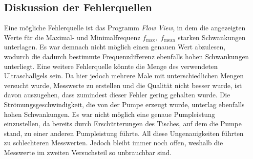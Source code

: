\subsection{Diskussion der Fehlerquellen}
\label{subsec:diskFehler}
Eine mögliche Fehlerquelle ist das Programm \textit{Flow View}, in dem die angezeigten Werte für die Maximal- und Minimalfrequenz $f_{\text{max}},\, \,f_{\text{mean}}$
starken Schwankungen unterlagen. Es war demnach nicht möglich einen genauen Wert abzulesen, wodurch die dadurch bestimmte Frequenzdifferenz ebenfalls
hohen Schwankungen unterliegt.
Eine weitere Fehlerquelle könnte die Menge des verwendeten Ultraschallgels sein. Da hier jedoch mehrere Male mit unterschiedlichen Mengen versucht wurde, Messwerte
zu erstellen und die Qualität nicht besser wurde, ist davon auszugehen, dass zumindest dieser Fehler gering gehalten wurde.
Die Strömungsgeschwindigkeit, die von der Pumpe erzeugt wurde, unterlag ebenfalls hohen Schwankungen. Es war nicht möglich eine genaue Pumpleistung
einzustellen, da bereits durch Erschütterungen des Tisches, auf dem die Pumpe stand, zu einer anderen Pumpleistung führte.
All diese Ungenauigkeiten führten zu schlechteren Messwerten. Jedoch bleibt immer noch offen, weshalb die Messwerte im zweiten Versuchsteil so unbrauchbar sind.

